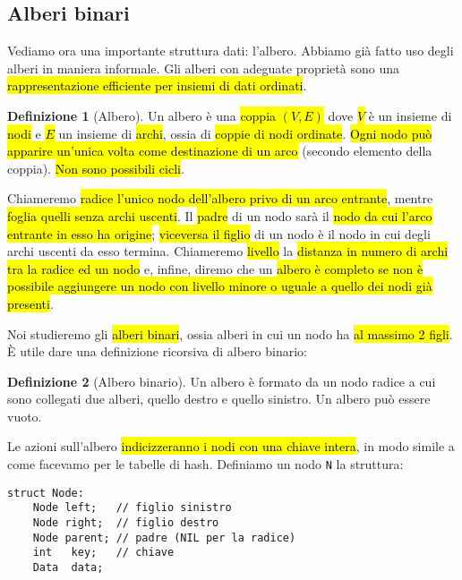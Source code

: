 \documentclass[a4paper,11pt,twoside]{article}
\theoremstyle{plain}
\theoremstyle{definition}
\newtheorem{defn}{Definizione}[section]
\theoremstyle{remark}
\begin{document}
\subsection{Alberi binari}\label{sec:tree}

Vediamo ora una importante struttura dati: l'albero. Abbiamo già fatto uso degli
alberi in maniera informale. Gli alberi con adeguate proprietà sono una
\hl{rappresentazione efficiente per insiemi di dati ordinati}.

\begin{defn}[Albero]\label{def:tree}
  Un albero è una \hl{coppia $(V, E)$} dove \hl{$V$} è un insieme di \hl{nodi} e
  \hl{$E$} un insieme di \hl{archi}, ossia di \hl{coppie di nodi ordinate}.
  \hl{Ogni nodo può apparire un'unica volta come destinazione di un arco}
  (secondo elemento della coppia). \hl{Non sono possibili cicli}.
\end{defn}

Chiameremo \hl{radice l'unico nodo dell'albero privo di un arco entrante},
mentre \hl{foglia quelli senza archi uscenti}. Il \hl{padre} di un nodo sarà il
\hl{nodo da cui l'arco entrante in esso ha origine}; \hl{viceversa il figlio} di
un nodo è il nodo in cui degli archi uscenti da esso termina. Chiameremo
\hl{livello} la \hl{distanza in numero di archi tra la radice ed un nodo} e,
infine, diremo che un \hl{albero è completo se non è possibile aggiungere un
nodo con livello minore o uguale a quello dei nodi già presenti}.

Noi studieremo gli \hl{alberi binari}, ossia alberi in cui un nodo ha \hl{al massimo 2
figli}. È utile dare una definizione ricorsiva di albero binario:

\begin{defn}[Albero binario]\label{def:binary-tree}
  Un albero è formato da un nodo radice a cui sono collegati due alberi,
  quello destro e quello sinistro. Un albero può essere vuoto.
\end{defn}

Le azioni sull'albero \hl{indicizzeranno i nodi con una chiave intera}, in modo
simile a come facevamo per le tabelle di hash. Definiamo un nodo \texttt{N} la
struttura:

\begin{lstlisting}[language=pseudocodice,gobble=2]
  struct Node:
    Node left;   // figlio sinistro
    Node right;  // figlio destro
    Node parent; // padre (NIL per la radice)
    int   key;   // chiave
    Data  data;
\end{lstlisting}
\end{document}
